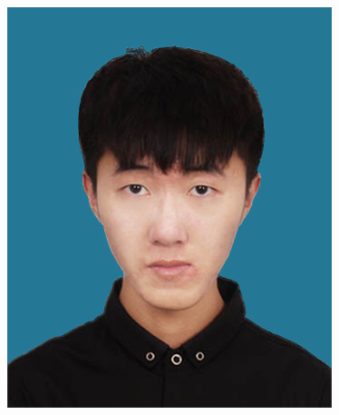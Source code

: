 \documentclass[a4paper,12pt,final]{memoir}
\begin{document}
\begin{figure}
	\hfill
	\includegraphics[width=0.8\columnwidth]{../img/photo.jpg}
	\vspace{-7cm}
\end{figure}
\end{document}
